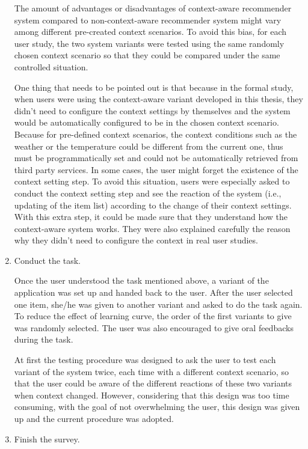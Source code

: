\begin{enumerate}
The amount of advantages or disadvantages of context-aware recommender system compared to non-context-aware recommender system might vary among different pre-created context scenarios. To avoid this bias, for each user study, the two system variants were tested using the same randomly chosen context scenario so that they could be compared under the same controlled situation. 

One thing that needs to be pointed out is that because in the formal study, when users were using the context-aware variant developed in this thesis, they didn't need to configure the context settings by themselves and the system would be automatically configured to be in the chosen context scenario. Because for pre-defined context scenarios, the context conditions such as the weather or the temperature could be different from the current one, thus must be programmatically set and could not be automatically retrieved from third party services. In some cases, the user might forget the existence of the context setting step. To avoid this situation, users were especially asked to conduct the context setting step and see the reaction of the system (i.e., updating of the item list) according to the change of their context settings. With this extra step, it could be made sure that they understand how the context-aware system works. They were also explained carefully the reason why they didn't need to configure the context in real user studies.

\item{Conduct the task.}

Once the user understood the task mentioned above, a variant of the application was set up and handed back to the user. After the user selected one item, she/he was given to another variant and asked to do the task again. To reduce the effect of learning curve, the order of the first variants to give was randomly selected. The user was also encouraged to give oral feedbacks during the task. 

At first the testing procedure was designed to ask the user to test each variant of the system twice, each time with a different context scenario, so that the user could be aware of the different reactions of these two variants when context changed. However, considering that this design was too time consuming, with the goal of not overwhelming the user, this design was given up and the current procedure was adopted.

\item{Finish the survey.}


\end{enumerate}
